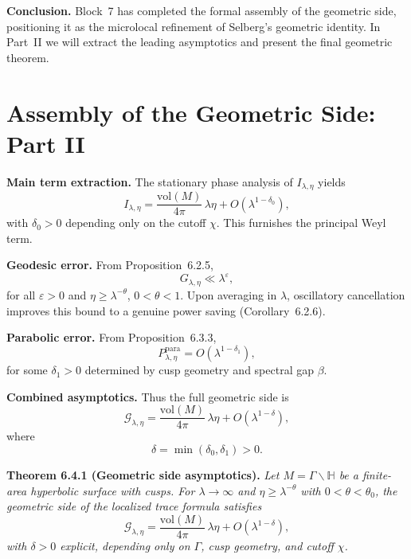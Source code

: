 \medskip

\noindent\textbf{Conclusion.}
Block~7 has completed the formal assembly of the geometric side,  
positioning it as the microlocal refinement of Selberg’s geometric identity.  
In Part~II we will extract the leading asymptotics and present the final geometric theorem.


\section{Assembly of the Geometric Side: Part II}

\noindent\textbf{Main term extraction.}
The stationary phase analysis of $I_{\lambda,\eta}$ yields
\[
  I_{\lambda,\eta}
  = \frac{\mathrm{vol}(M)}{4\pi}\, \lambda \eta
  + O(\lambda^{1-\delta_0}),
\]
with $\delta_0>0$ depending only on the cutoff $\chi$.  
This furnishes the principal Weyl term.

\medskip

\noindent\textbf{Geodesic error.}
From Proposition~6.2.5,
\[
  G_{\lambda,\eta} \ll \lambda^\varepsilon,
\]
for all $\varepsilon>0$ and $\eta\ge \lambda^{-\theta}$, $0<\theta<1$.  
Upon averaging in $\lambda$, oscillatory cancellation improves this bound to a genuine power saving (Corollary~6.2.6).

\medskip

\noindent\textbf{Parabolic error.}
From Proposition~6.3.3,
\[
  P_{\lambda,\eta}^{\mathrm{para}}
  = O(\lambda^{1-\delta_1}),
\]
for some $\delta_1>0$ determined by cusp geometry and spectral gap $\beta$.

\medskip

\noindent\textbf{Combined asymptotics.}
Thus the full geometric side is
\[
  \mathcal{G}_{\lambda,\eta}
  = \frac{\mathrm{vol}(M)}{4\pi}\, \lambda \eta
  + O(\lambda^{1-\delta}),
\]
where
\[
  \delta = \min(\delta_0,\delta_1) > 0.
\]

\medskip

\noindent\textbf{Theorem 6.4.1 (Geometric side asymptotics).}
\emph{Let $M=\Gamma\backslash\mathbb{H}$ be a finite-area hyperbolic surface with cusps.  
For $\lambda\to\infty$ and $\eta \ge \lambda^{-\theta}$ with $0<\theta<\theta_0$,  
the geometric side of the localized trace formula satisfies}
\[
  \mathcal{G}_{\lambda,\eta}
  = \frac{\mathrm{vol}(M)}{4\pi}\, \lambda \eta
  + O(\lambda^{1-\delta}),
\]
\emph{with $\delta>0$ explicit, depending only on $\Gamma$, cusp geometry, and cutoff $\chi$.}

